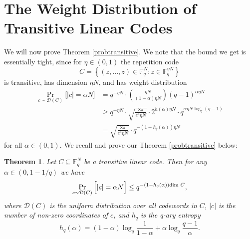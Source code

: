 \documentclass[12pt]{article}
\newtheorem*{theorem*}{Theorem}
\newcommand{\F}{\mathbb{F}}
\begin{document}
\section{The Weight Distribution of Transitive Linear Codes}\label{weighttransitive}
We will now prove Theorem \ref{probtransitive}. We note that the bound we get is essentially tight, since for $\eta\in(0,1)$ the repetition code $$C=\left\{(z,...,z)\in\F_q^N:z\in\F_q^{\eta N}\right\}$$ is transitive, has dimension $\eta N$, and has weight distribution 
\begin{align*}
\Pr_{c\sim \mathcal{D}(C)}\Big[|c| = \alpha N\Big] &=q^{-\eta N} \cdot \binom{\eta N}{(1-\alpha) \eta N} (q-1)^{\alpha\eta N}\\
&\geq q^{-\eta N} \cdot \sqrt{\frac{8\pi}{e^4\eta N}}\cdot 2^{h(\alpha)\eta N}\cdot q^{\alpha \eta N \log_q (q-1)}\\
&= \sqrt{\frac{8\pi}{e^4\eta N}}\cdot q^{-(1-h_q(\alpha))\eta N}
\end{align*}
for all $\alpha\in(0,1)$. We recall and prove our Theorem \ref{probtransitive} below:
\begin{theorem*}
Let $C\subseteq \mathbb{F}_q^N$ be a transitive linear code. Then for any $\alpha\in (0,1-1/q)$ we have
$$ \Pr_{c\sim \mathcal{D}(C)}\Big[|c| = \alpha N\Big] \leq q^{-(1-h_q(\alpha)) \textnormal{dim }C},$$
where $\mathcal{D}(C)$ is the uniform distribution over all codewords in $C$, $|c|$ is the number of non-zero coordinates of $c$, and $h_q$ is the q-ary entropy $$h_q(\alpha)= (1-\alpha) \log_q \frac{1}{1-\alpha} + \alpha \log_q\frac{q-1}{\alpha}.$$
\end{theorem*}
\end{document}
